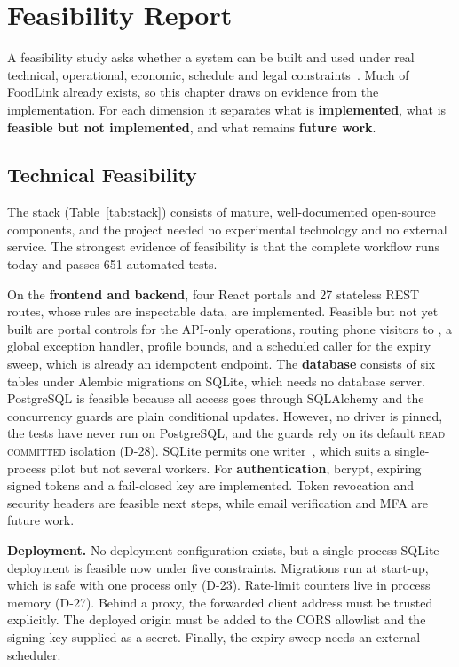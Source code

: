 \chapter{Feasibility Report}
\label{ch:feasibility}

A feasibility study asks whether a system can be built and used under real
technical, operational, economic, schedule and legal
constraints~\cite{sommerville2016,pressman2015}. Much of FoodLink already
exists, so this chapter draws on evidence from the implementation. For each
dimension it separates what is \textbf{implemented}, what is \textbf{feasible
but not implemented}, and what remains \textbf{future work}.

\section{Technical Feasibility}
\label{sec:feas-technical}

The stack (Table~\ref{tab:stack}) consists of mature, well-documented
open-source components, and the project needed no experimental technology and
no external service. The strongest evidence of feasibility is that the complete
workflow runs today and passes 651 automated tests.

On the \textbf{frontend and backend}, four React portals and 27 stateless REST
routes, whose rules are inspectable data, are implemented. Feasible but not yet
built are portal controls for the API-only operations, routing phone visitors to
, a global exception handler, profile bounds, and a scheduled caller
for the expiry sweep, which is already an idempotent endpoint. The
\textbf{database} consists of six tables under Alembic migrations on SQLite,
which needs no database server. PostgreSQL is feasible because all access goes
through SQLAlchemy and the concurrency guards are plain conditional updates.
However, no driver is pinned, the tests have never run on PostgreSQL, and the
guards rely on its default \textsc{read committed} isolation (D-28). SQLite
permits one writer~\cite{sqliteWhenToUse}, which suits a single-process pilot
but not several workers. For \textbf{authentication}, bcrypt, expiring signed
tokens and a fail-closed key are implemented. Token revocation and security
headers are feasible next steps, while email verification and MFA are future
work.

\textbf{Deployment.} No deployment configuration exists, but a single-process
SQLite deployment is feasible now under five constraints. Migrations run at
start-up, which is safe with one process only (D-23). Rate-limit counters live
in process memory (D-27). Behind a proxy, the forwarded client address must be
trusted explicitly. The deployed origin must be added to the CORS allowlist and
the signing key supplied as a secret. Finally, the expiry sweep needs an external
scheduler.

